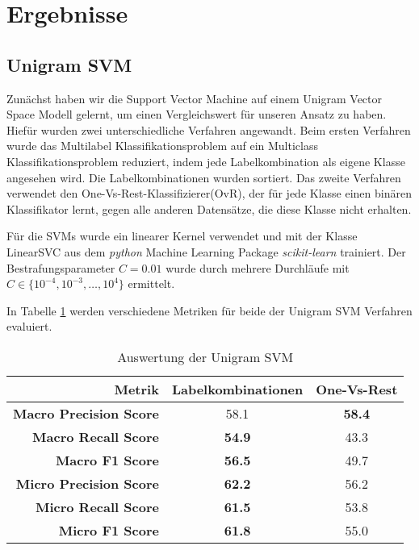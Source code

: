 \section{Ergebnisse}
\subsection{Unigram SVM}
\label{sub:unigram_svm}

Zunächst haben wir die Support Vector Machine auf einem Unigram Vector Space Modell gelernt,
um einen Vergleichswert für unseren Ansatz zu haben.
Hiefür wurden zwei unterschiedliche Verfahren angewandt.
Beim ersten Verfahren wurde das Multilabel Klassifikationsproblem auf ein Multiclass Klassifikationsproblem reduziert,
indem jede Labelkombination als eigene Klasse angesehen wird.
Die Labelkombinationen wurden sortiert.
Das zweite Verfahren verwendet den One-Vs-Rest-Klassifizierer(OvR), der für jede Klasse einen binären Klassifikator lernt,
gegen alle anderen Datensätze, die diese Klasse nicht erhalten.

Für die SVMs wurde ein linearer Kernel verwendet und mit der Klasse LinearSVC aus dem \emph{python} Machine Learning Package \emph{scikit-learn} \cite{scikit-learn} trainiert.
Der Bestrafungsparameter $C = 0.01$ wurde durch mehrere Durchläufe mit $C \in \{ 10^{-4},10^{-3}, \dots, 10^4 \}$ ermittelt.

In Tabelle \ref{tab:unigram_svm} werden verschiedene Metriken für beide der Unigram SVM Verfahren evaluiert.

\begin{table}[h]
    \centering
    \begin{tabular}{r|cc}
        \small \textbf{Metrik} & \small\textbf{Labelkombinationen} & \small\textbf{One-Vs-Rest}\\
        \hline
        \small \textbf{Macro Precision Score}  & \small 58.1 & \small  \textbf{58.4}\\
        \small \textbf{Macro Recall Score}     & \small \textbf{54.9} & \small 43.3\\
        \small \textbf{Macro F1 Score}        & \small \textbf{56.5} & \small 49.7\\
        \small \textbf{Micro Precision Score} & \small \textbf{62.2} & \small 56.2\\
        \small \textbf{Micro Recall Score}    & \small \textbf{61.5} & \small 53.8\\
        \small \textbf{Micro F1 Score}        & \small \textbf{61.8} & \small 55.0\\
    \end{tabular}
    \caption{Auswertung der Unigram SVM}
    \label{tab:unigram_svm}
\end{table}

